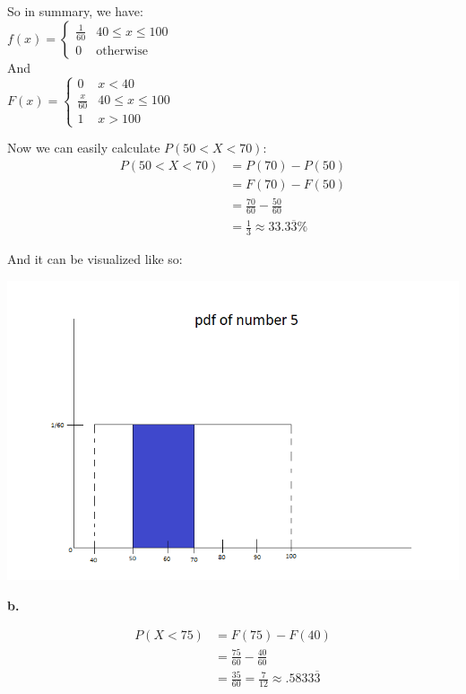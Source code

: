 \documentclass[12pt]{report}
\newcommand{\twopartdef}[4]
{
	\left\{
	\begin{array}{ll}
		#1 & \mbox{} #2 \\
		#3 & \mbox{} #4
	\end{array}
	\right.
}
\newcommand{\threepartdef}[6]
{
	\left\{
	\begin{array}{lll}
		#1 & \mbox{} #2 \\
		#3 & \mbox{} #4 \\
		#5 & \mbox{} #6
	\end{array}
	\right.
}
\begin{document}
\noindent So in summary, we have:\\

\centering
$f(x) = \twopartdef{\frac{1}{60}}{40 \leq x \leq 100}{0}{\text{otherwise}}$\\
\bigskip
\noindent And\\
\bigskip
$F(x) = \threepartdef{0}{x < 40}{\frac{x}{60}}{40 \leq x \leq 100}{1}{x > 100}$\\

\justify

\pagebreak
\noindent Now we can easily calculate $P(50 < X < 70)$:
\begin{align*}
P(50 < X < 70) &= P(70) - P(50)\\
&= F(70) - F(50)\\
&= \frac{70}{60} - \frac{50}{60}\\
&= \boxed{\frac{1}{3} \approx 33.3\overline{3}\%}
\end{align*}

\noindent And it can be visualized like so:

\includegraphics[scale = .7]{hw3_5a}

\pagebreak

\noindent \textbf{b.}

\begin{align*}
P(X < 75) &= F(75) - F(40)\\
&= \frac{75}{60} - \frac{40}{60}\\
&= \boxed{\frac{35}{60} = \frac{7}{12} \approx .5833\overline{3}}
\end{align*}
\end{document}
